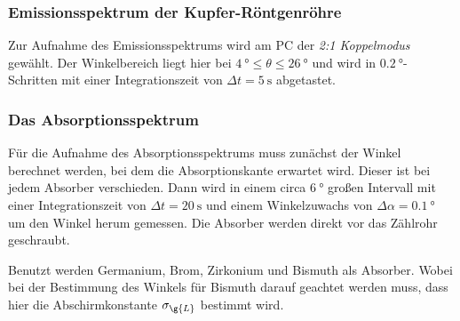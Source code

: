 \subsubsection{Emissionsspektrum der Kupfer-Röntgenröhre}

Zur Aufnahme des Emissionsspektrums wird am PC der \emph{2:1 Koppelmodus} gewählt.
Der Winkelbereich liegt hier bei $\SI{4}{\degree} \leq \theta \leq \SI{26}{\degree}$
und wird in $\SI{0.2}{\degree}$-Schritten mit einer Integrationszeit von $\Delta t = \SI{5}{\second}$
abgetastet.

\subsubsection{Das Absorptionsspektrum}

Für die Aufnahme des Absorptionsspektrums muss zunächst der Winkel berechnet werden, bei
dem die Absorptionskante erwartet wird. Dieser ist bei jedem Absorber verschieden.
Dann wird in einem circa $\SI{6}{\degree}$ großen Intervall mit einer Integrationszeit
von $\Delta t = \SI{20}{\second}$ und einem Winkelzuwachs von $\Delta \alpha = \SI{0.1}{\degree}$
um den Winkel herum gemessen. Die Absorber werden direkt vor das Zählrohr geschraubt.

Benutzt werden Germanium, Brom, Zirkonium und Bismuth als Absorber. Wobei bei der
Bestimmung des Winkels für Bismuth darauf geachtet werden muss, dass hier die
Abschirmkonstante $\sigma_{\g{L}}$ bestimmt wird.
